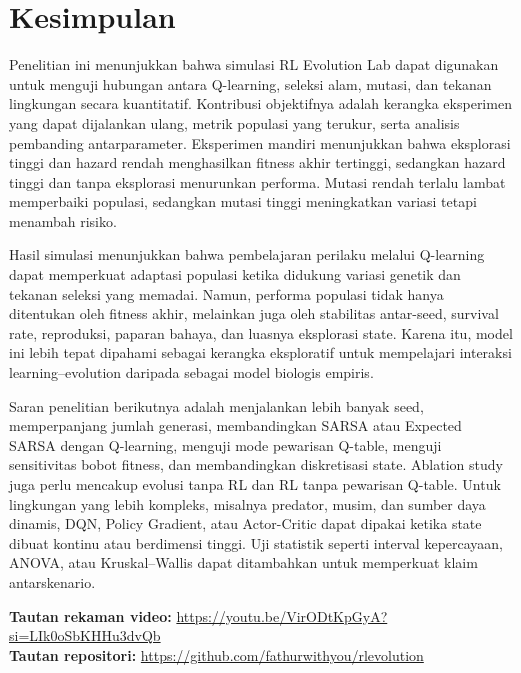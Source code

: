 \documentclass[10pt]{article}
\begin{document}
\section{Kesimpulan}
Penelitian ini menunjukkan bahwa simulasi RL Evolution Lab dapat digunakan untuk menguji hubungan antara Q-learning, seleksi alam, mutasi, dan tekanan lingkungan secara kuantitatif. Kontribusi objektifnya adalah kerangka eksperimen yang dapat dijalankan ulang, metrik populasi yang terukur, serta analisis pembanding antarparameter. Eksperimen mandiri menunjukkan bahwa eksplorasi tinggi dan hazard rendah menghasilkan fitness akhir tertinggi, sedangkan hazard tinggi dan tanpa eksplorasi menurunkan performa. Mutasi rendah terlalu lambat memperbaiki populasi, sedangkan mutasi tinggi meningkatkan variasi tetapi menambah risiko.

Hasil simulasi menunjukkan bahwa pembelajaran perilaku melalui Q-learning dapat memperkuat adaptasi populasi ketika didukung variasi genetik dan tekanan seleksi yang memadai. Namun, performa populasi tidak hanya ditentukan oleh fitness akhir, melainkan juga oleh stabilitas antar-seed, survival rate, reproduksi, paparan bahaya, dan luasnya eksplorasi state. Karena itu, model ini lebih tepat dipahami sebagai kerangka eksploratif untuk mempelajari interaksi learning--evolution daripada sebagai model biologis empiris.

Saran penelitian berikutnya adalah menjalankan lebih banyak seed, memperpanjang jumlah generasi, membandingkan SARSA atau Expected SARSA dengan Q-learning, menguji mode pewarisan Q-table, menguji sensitivitas bobot fitness, dan membandingkan diskretisasi state. Ablation study juga perlu mencakup evolusi tanpa RL dan RL tanpa pewarisan Q-table. Untuk lingkungan yang lebih kompleks, misalnya predator, musim, dan sumber daya dinamis, DQN, Policy Gradient, atau Actor-Critic dapat dipakai ketika state dibuat kontinu atau berdimensi tinggi. Uji statistik seperti interval kepercayaan, ANOVA, atau Kruskal--Wallis dapat ditambahkan untuk memperkuat klaim antarskenario.

\textbf{Tautan rekaman video:} \url{https://youtu.be/VirODtKpGyA?si=LIk0oSbKHHu3dvQb}\\
\textbf{Tautan repositori:} \url{https://github.com/fathurwithyou/rlevolution}



\end{document}
